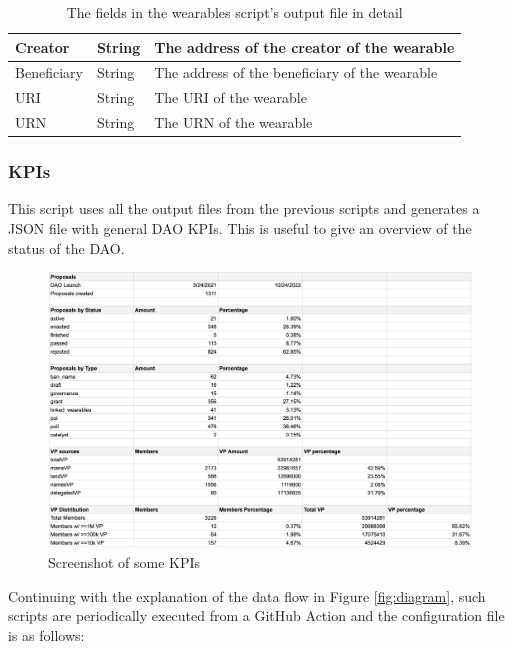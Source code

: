 \documentclass[MSE,Master,english]{twbook}%
\begin{document}
\begin{table}[H]
\begin{tabularx}{\textwidth}{|l|l|X|}
  Creator      & String  & The address of the creator of the wearable       \\ \hline
  Beneficiary  & String  & The address of the beneficiary of the wearable   \\ \hline
  URI          & String  & The URI of the wearable                          \\ \hline
  URN          & String  & The URN of the wearable                          \\ \hline
  \end{tabularx}
  \caption{The fields in the wearables script's output file in detail}
  \label{table:wearables}
\end{table}

\subsubsection{KPIs}
This script uses all the output files from the previous scripts and generates a JSON file with general \gls{DAO} KPIs. This is useful to give an overview of the status of the \gls{DAO}.
\begin{figure}[H]
  \centering
  \includegraphics[width=\textwidth]{kpis.png}
  \caption{Screenshot of some KPIs}
  \label{fig:kpis}
\end{figure}

\pagebreak

Continuing with the explanation of the data flow in Figure \ref{fig:diagram}, such scripts are periodically executed from a GitHub Action and the configuration file\cite{configFile} is as follows: \\
\end{document}
